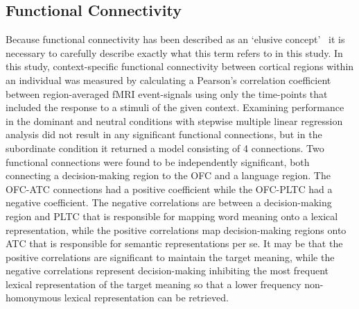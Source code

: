 \documentclass[final,authoryear,5p,times,twocolumn]{elsarticle}
\begin{document}
\subsection{Functional Connectivity}
Because functional connectivity has been described as an `elusive concept'~\cite{Horwitz2003} it is necessary to carefully describe exactly what this term refers to in this study. In this study, context-specific functional connectivity between cortical regions within an individual was measured by calculating a Pearson's correlation coefficient between region-averaged fMRI event-signals using only the time-points that included the response to a stimuli of the given context. Examining performance in the dominant and neutral conditions with stepwise multiple linear regression analysis did not result in any significant functional connections, but in the subordinate condition it returned a model consisting of 4 connections. Two functional connections were found to be independently significant, both connecting a decision-making region to the OFC and a language region. The OFC-ATC connections had a positive coefficient while the OFC-PLTC had a negative coefficient. The negative correlations are between a decision-making region and PLTC that is responsible for mapping word meaning onto a lexical representation, while the positive correlations map decision-making regions onto ATC that is responsible for semantic representations per se. It may be that the positive correlations are significant to maintain the target meaning, while the negative correlations represent decision-making inhibiting the most frequent lexical representation of the target meaning so that a lower frequency non-homonymous lexical representation can be retrieved. 
\end{document}
